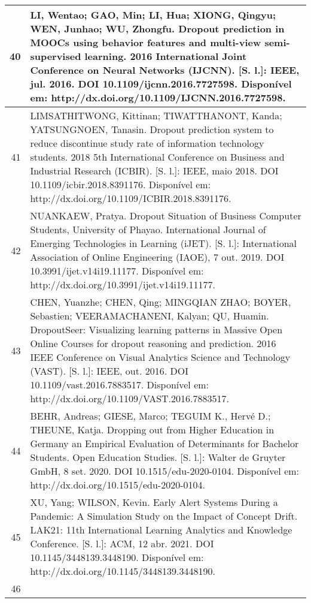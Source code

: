 \begin{apendicesenv}
\begin{longtable}[c]{|r|l|}
40 &
  \multicolumn{1}{p{14.5cm}|}{LI, Wentao; GAO, Min; LI, Hua; XIONG, Qingyu; WEN, Junhao; WU, Zhongfu. Dropout prediction in MOOCs using behavior features and multi-view semi-supervised learning. 2016 International Joint Conference on Neural Networks (IJCNN). {[}S. l.{]}: IEEE, jul. 2016. DOI 10.1109/ijcnn.2016.7727598. Disponível em: http://dx.doi.org/10.1109/IJCNN.2016.7727598.} \\ \hline
41 &
  \multicolumn{1}{p{14.5cm}|}{LIMSATHITWONG, Kittinan; TIWATTHANONT, Kanda; YATSUNGNOEN, Tanasin. Dropout prediction system to reduce discontinue study rate of information technology students. 2018 5th International Conference on Business and Industrial Research (ICBIR). {[}S. l.{]}: IEEE, maio 2018. DOI 10.1109/icbir.2018.8391176. Disponível em: http://dx.doi.org/10.1109/ICBIR.2018.8391176.} \\ \hline
42 &
  \multicolumn{1}{p{14.5cm}|}{NUANKAEW, Pratya. Dropout Situation of Business Computer Students, University of Phayao. International Journal of Emerging Technologies in Learning (iJET). {[}S. l.{]}: International Association of Online Engineering (IAOE), 7 out. 2019. DOI 10.3991/ijet.v14i19.11177. Disponível em: http://dx.doi.org/10.3991/ijet.v14i19.11177.} \\ \hline
43 &
  \multicolumn{1}{p{14.5cm}|}{CHEN, Yuanzhe; CHEN, Qing; MINGQIAN ZHAO; BOYER, Sebastien; VEERAMACHANENI, Kalyan; QU, Huamin. DropoutSeer: Visualizing learning patterns in Massive Open Online Courses for dropout reasoning and prediction. 2016 IEEE Conference on Visual Analytics Science and Technology (VAST). {[}S. l.{]}: IEEE, out. 2016. DOI 10.1109/vast.2016.7883517. Disponível em: http://dx.doi.org/10.1109/VAST.2016.7883517.} \\ \hline
44 &
  \multicolumn{1}{p{14.5cm}|}{BEHR, Andreas; GIESE, Marco; TEGUIM K., Hervé D.; THEUNE, Katja. Dropping out from Higher Education in Germany an Empirical Evaluation of Determinants for Bachelor Students. Open Education Studies. {[}S. l.{]}: Walter de Gruyter GmbH, 8 set. 2020. DOI 10.1515/edu-2020-0104. Disponível em: http://dx.doi.org/10.1515/edu-2020-0104.} \\ \hline
45 &
  \multicolumn{1}{p{14.5cm}|}{XU, Yang; WILSON, Kevin. Early Alert Systems During a Pandemic: A Simulation Study on the Impact of Concept Drift. LAK21: 11th International Learning Analytics and Knowledge Conference. {[}S. l.{]}: ACM, 12 abr. 2021. DOI 10.1145/3448139.3448190. Disponível em: http://dx.doi.org/10.1145/3448139.3448190.} \\ \hline
46 &

\end{longtable}
\end{apendicesenv}
